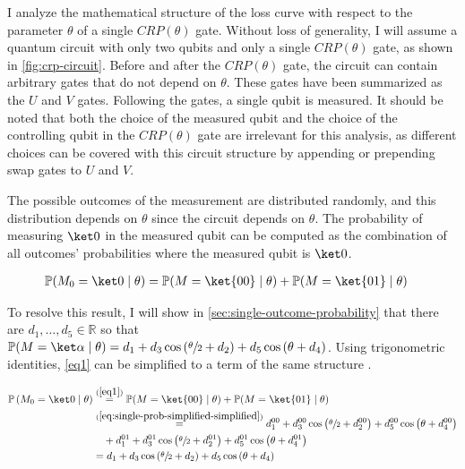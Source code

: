 I analyze the mathematical structure of the loss curve with respect to the
parameter $\theta$ of a single $CRP(\theta)$ gate.
Without loss of generality, I will assume a quantum circuit with only two
qubits and only a single $CRP(\theta)$ gate, as shown in
\autoref{fig:crp-circuit}.
Before and after the $CRP(\theta)$ gate, the circuit can contain arbitrary gates
that do not depend on $\theta$.
These gates have been summarized as the $U$ and $V$ gates.
Following the gates, a single qubit is measured.
It should be noted that both the choice of the measured qubit and the choice of
the controlling qubit in the $CRP(\theta)$ gate are irrelevant for this
analysis, as different choices can be covered with this circuit structure by
appending or prepending swap gates to $U$ and $V$.

The possible outcomes of the measurement are distributed randomly, and this
distribution depends on $\theta$ since the circuit depends on $\theta$.
The probability of measuring $\ket 0$ in the measured qubit can be computed as
the combination of all outcomes' probabilities where the measured qubit is
$\ket 0$.

\begin{equation}
    \label{eq1}
    \begin{split}
        \mathbb{P}(M_0 = \ket 0 \mid \theta)
            &= \mathbb{P}(M = \ket{00} \mid \theta) + \mathbb{P}(M = \ket{01} \mid \theta)
    \end{split}
\end{equation}

To resolve this result, I will show in \autoref{sec:single-outcome-probability}
that there are $d_1, \dots, d_5 \in \mathbb R$ so that
$\mathbb P(M = \ket\alpha \mid \theta) = d_1 + d_3 \cos\left(\sfrac\theta2 + d_2\right) + d_5 \cos\left(\theta + d_4\right)$.
Using trigonometric identities, \autoref{eq1} can be simplified to a term
of the same structure \cite{bronstejn_taschenbuch_2016}.

\begin{equation}
    \label{eq:total-result-probability}
    \begin{split}
        \mathbb P\left(M_0 = \ket 0 \mid \theta\right)
            &\stackrel{(\ref{eq1})}=
                \mathbb{P}(M = \ket{00} \mid \theta) + \mathbb{P}(M = \ket{01} \mid \theta) \\
            &\stackrel{(\ref{eq:single-prob-simplified-simplified})}=
                d_1^{00} + d_3^{00} \cos\left(\sfrac\theta2 + d_2^{00}\right) + d_5^{00} \cos\left(\theta + d_4^{00}\right) \\
                &\quad + d_1^{01} + d_3^{01} \cos\left(\sfrac\theta2 + d_2^{01}\right) + d_5^{01} \cos\left(\theta + d_4^{01}\right) \\
            &= d_1 + d_3 \cos\left(\sfrac\theta2 + d_2\right) + d_5 \cos\left(\theta + d_4\right)
    \end{split}
\end{equation}

